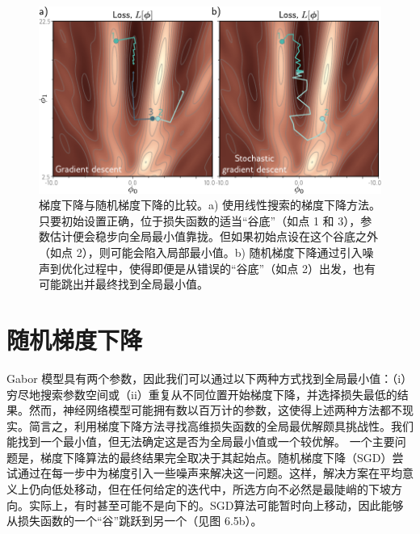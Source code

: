 \documentclass[lang=cn,newtx,10pt,scheme=chinese]{elegantbook}
\begin{document}
\begin{figure}[ht!]
\centering
\includegraphics[width=0.7\linewidth]{PDFFigures/UDLChap6PDF/TrainGaborGDSGD.pdf}
\caption{梯度下降与随机梯度下降的比较。a) 使用线性搜索的梯度下降方法。只要初始设置正确，位于损失函数的适当“谷底”（如点 1 和 3），参数估计便会稳步向全局最小值靠拢。但如果初始点设在这个谷底之外（如点 2），则可能会陷入局部最小值。b) 随机梯度下降通过引入噪声到优化过程中，使得即便是从错误的“谷底”（如点 2）出发，也有可能跳出并最终找到全局最小值。}
\end{figure}

\section{随机梯度下降}
Gabor 模型具有两个参数，因此我们可以通过以下两种方式找到全局最小值：（i）穷尽地搜索参数空间或（ii）重复从不同位置开始梯度下降，并选择损失最低的结果。然而，神经网络模型可能拥有数以百万计的参数，这使得上述两种方法都不现实。简言之，利用梯度下降方法寻找高维损失函数的全局最优解颇具挑战性。我们能找到一个最小值，但无法确定这是否为全局最小值或一个较优解。
一个主要问题是，梯度下降算法的最终结果完全取决于其起始点。随机梯度下降（SGD）尝试通过在每一步中为梯度引入一些噪声来解决这一问题。这样，解决方案在平均意义上仍向低处移动，但在任何给定的迭代中，所选方向不必然是最陡峭的下坡方向。实际上，有时甚至可能不是向下的。SGD算法可能暂时向上移动，因此能够从损失函数的一个“谷”跳跃到另一个（见图 6.5b）。
\end{document}
